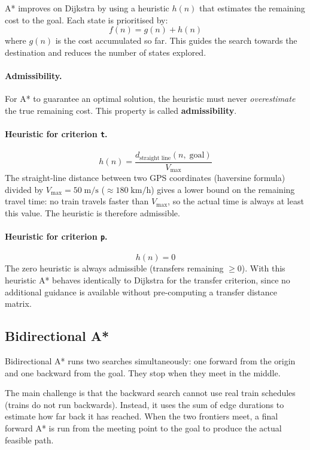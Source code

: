 \documentclass[12pt,a4paper]{article}
\begin{document}
A* improves on Dijkstra by using a heuristic $h(n)$ that estimates the
remaining cost to the goal. Each state is prioritised by:
\[
  f(n) = g(n) + h(n)
\]
where $g(n)$ is the cost accumulated so far. This guides the search towards
the destination and reduces the number of states explored.

\paragraph{Admissibility.}
For A* to guarantee an optimal solution, the heuristic must never
\emph{overestimate} the true remaining cost. This property is called
\textbf{admissibility}.

\paragraph{Heuristic for criterion \texttt{t}.}
\[
  h(n) = \frac{d_{\text{straight line}}(n,\; \text{goal})}{V_{\max}}
\]
The straight-line distance between two GPS coordinates (haversine formula) divided
by $V_{\max} = 50\;\text{m/s}$ ($\approx 180\;\text{km/h}$) gives a lower bound
on the remaining travel time: no train travels faster than $V_{\max}$, so the
actual time is always at least this value. The heuristic is therefore admissible.

\paragraph{Heuristic for criterion \texttt{p}.}
\[
  h(n) = 0
\]
The zero heuristic is always admissible (transfers remaining $\geq 0$). With
this heuristic A* behaves identically to Dijkstra for the transfer criterion,
since no additional guidance is available without pre-computing a transfer
distance matrix.

\subsection{Bidirectional A*}

Bidirectional A* runs two searches simultaneously: one forward from the origin
and one backward from the goal. They stop when they meet in the middle.

The main challenge is that the backward search cannot use real train schedules
(trains do not run backwards). Instead, it uses the sum of edge durations to
estimate how far back it has reached. When the two frontiers meet, a final
forward A* is run from the meeting point to the goal to produce the actual
feasible path.
\end{document}
